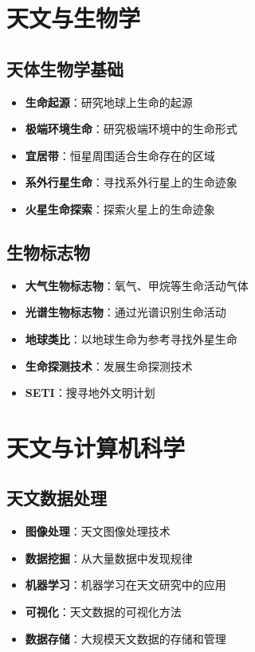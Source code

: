 \documentclass[12pt,UTF8]{ctexbook}
\begin{document}
\chapter{天文与生物学}
\section{天体生物学基础}

\begin{itemize}
  \item \textbf{生命起源}：研究地球上生命的起源
  \item \textbf{极端环境生命}：研究极端环境中的生命形式
  \item \textbf{宜居带}：恒星周围适合生命存在的区域
  \item \textbf{系外行星生命}：寻找系外行星上的生命迹象
  \item \textbf{火星生命探索}：探索火星上的生命迹象
\end{itemize}

\section{生物标志物}

\begin{itemize}
  \item \textbf{大气生物标志物}：氧气、甲烷等生命活动气体
  \item \textbf{光谱生物标志物}：通过光谱识别生命活动
  \item \textbf{地球类比}：以地球生命为参考寻找外星生命
  \item \textbf{生命探测技术}：发展生命探测技术
  \item \textbf{SETI}：搜寻地外文明计划
\end{itemize}

\chapter{天文与计算机科学}
\section{天文数据处理}

\begin{itemize}
  \item \textbf{图像处理}：天文图像处理技术
  \item \textbf{数据挖掘}：从大量数据中发现规律
  \item \textbf{机器学习}：机器学习在天文研究中的应用
  \item \textbf{可视化}：天文数据的可视化方法
  \item \textbf{数据存储}：大规模天文数据的存储和管理
\end{itemize}
\end{document}
